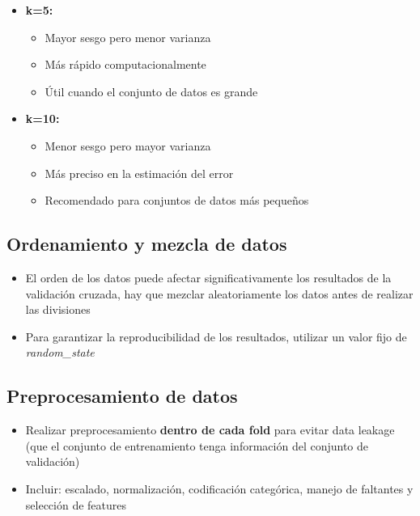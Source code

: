 \documentclass[12pt]{article}
\begin{document}
\begin{itemize}
    \item \textbf{k=5:} 
    \begin{itemize}
        \item Mayor sesgo pero menor varianza
        \item Más rápido computacionalmente
        \item Útil cuando el conjunto de datos es grande
    \end{itemize}
    
    \item \textbf{k=10:}
    \begin{itemize}
        \item Menor sesgo pero mayor varianza
        \item Más preciso en la estimación del error
        \item Recomendado para conjuntos de datos más pequeños
    \end{itemize}
\end{itemize}

\subsection{Ordenamiento y mezcla de datos}
\begin{itemize}
    \item El orden de los datos puede afectar significativamente los resultados de la validación cruzada, hay que mezclar aleatoriamente los datos antes de realizar las divisiones
    \item Para garantizar la reproducibilidad de los resultados, utilizar un valor fijo de \textit{random\_state}
\end{itemize}

\subsection{Preprocesamiento de datos}
\begin{itemize}
    \item Realizar preprocesamiento \textbf{dentro de cada fold} para evitar data leakage (que el conjunto de entrenamiento tenga información del conjunto de validación)
    \item Incluir: escalado, normalización, codificación categórica, manejo de faltantes y selección de features
\end{itemize}
\end{document}

